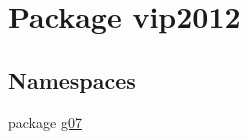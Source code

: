 \hypertarget{namespacevip2012}{\section{Package vip2012}
\label{namespacevip2012}
}
\subsection*{Namespaces}
\begin{DoxyCompactItemize}
\item 
package \hyperlink{namespacevip2012_1_1g07}{g07}
\end{DoxyCompactItemize}
